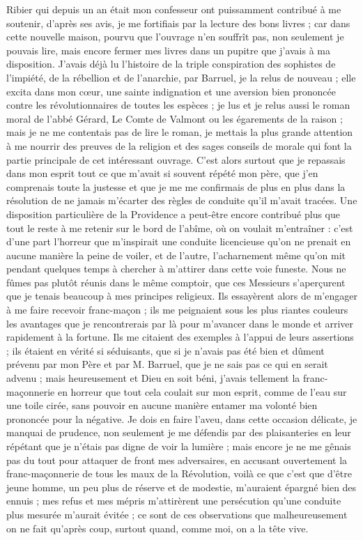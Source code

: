\documentclass[11pt,a4paper]{report}
\begin{document}
Ribier qui depuis un an était mon confesseur ont puissamment contribué à me soutenir, d'après ses avis, je me fortifiais par la lecture des bons livres ; car dans cette nouvelle maison, pourvu que l'ouvrage n'en souffrît pas, non seulement je pouvais lire, mais encore fermer mes livres dans un pupitre que j'avais à ma disposition. J'avais déjà lu l'histoire de la triple conspiration des sophistes de l'impiété, de la rébellion et de l'anarchie, par Barruel, je la relus de nouveau ; elle excita dans mon cœur, une sainte indignation et une aversion bien prononcée contre les révolutionnaires de toutes les espèces ; je lus et je relus aussi le roman moral de l'abbé Gérard, Le Comte de Valmont ou les égarements de la raison ; mais je ne me contentais pas de lire le roman, je mettais la plus grande attention à me nourrir des preuves de la religion et des sages conseils de morale qui font la partie principale de cet intéressant ouvrage. C'est alors surtout que je repassais dans mon esprit tout ce que m'avait si souvent répété mon père, que j'en comprenais toute la justesse et que je me me confirmais de plus en plus dans la résolution de ne jamais m'écarter des règles de conduite qu'il m'avait tracées. Une disposition particulière de la Providence a peut-être encore contribué plus que tout le reste à me retenir sur le bord de l'abîme, où on voulait m'entraîner : c'est d'une part l'horreur que m'inspirait une conduite licencieuse qu'on ne prenait en aucune manière la peine de voiler, et de l'autre, l'acharnement même qu'on mit pendant quelques temps à chercher à m'attirer dans cette voie funeste. Nous ne fûmes pas plutôt réunis dans le même comptoir, que ces Messieurs s'aperçurent que je tenais beaucoup à mes principes religieux. Ils essayèrent alors de m'engager à me faire recevoir franc-maçon ; ils me peignaient sous les plus riantes couleurs les avantages que je rencontrerais par là pour m'avancer dans le monde et arriver rapidement à la fortune. Ils me citaient des exemples à l'appui de leurs assertions ; ils étaient en vérité si séduisants, que si je n'avais pas été bien et dûment prévenu par mon Père et par M. Barruel, que je ne sais pas ce qui en serait advenu ; mais heureusement et Dieu en soit béni, j'avais tellement la franc-maçonnerie en horreur que tout cela coulait sur mon esprit, comme de l'eau sur une toile cirée, sans pouvoir en aucune manière entamer ma volonté bien prononcée pour la négative. Je dois en faire l'aveu, dans cette occasion délicate, je manquai de prudence, non seulement je me défendis par des plaisanteries en leur répétant que je n'étais pas digne de voir la lumière ; mais encore je ne me gênais pas du tout pour attaquer de front mes adversaires, en accusant ouvertement la franc-maçonnerie de tous les maux de la Révolution, voilà ce que c'est que d'être jeune homme, un peu plus de réserve et de modestie, m'auraient épargné bien des ennuis ; mes refus et mes mépris m'attirèrent une persécution qu'une conduite plus mesurée m'aurait évitée ; ce sont de ces observations que malheureusement on ne fait qu'après coup, surtout quand, comme moi, on a la tête vive.
\end{document}
